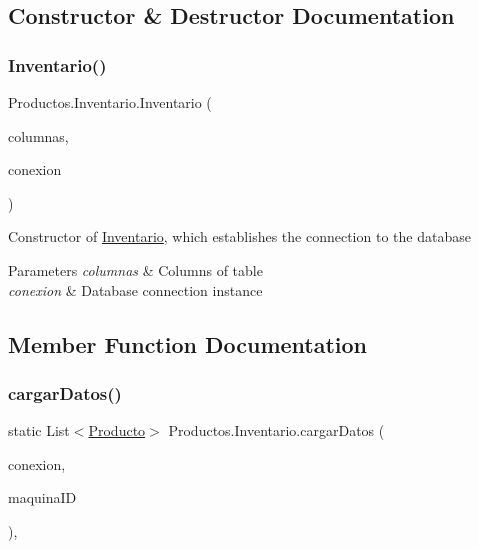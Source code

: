 \subsection{Constructor \& Destructor Documentation}
\mbox{\label{class_productos_1_1_inventario_a679f0131ec8bfb9a78d5071ee72f6811}} 
\subsubsection{\texorpdfstring{Inventario()}{Inventario()}}
{\footnotesize\ttfamily Productos.\+Inventario.\+Inventario (\begin{DoxyParamCaption}\item[{\mbox{\hyperlink{class_productos_1_1_modelo_columnas_tabla_producto}{Modelo\+Columnas\+Tabla\+Producto}}}]{columnas,  }\item[{\mbox{\hyperlink{classconexion_s_q_l_1_1_my_data_access}{My\+Data\+Access}}}]{conexion }\end{DoxyParamCaption})\hspace{0.3cm}{\ttfamily [inline]}}

Constructor of \mbox{\hyperlink{class_productos_1_1_inventario}{Inventario}}, which establishes the connection to the database 
\begin{DoxyParams}{Parameters}
{\em columnas} & Columns of table \\
\hline
{\em conexion} & Database connection instance \\
\hline
\end{DoxyParams}


\subsection{Member Function Documentation}
\mbox{\label{class_productos_1_1_inventario_a89ddb54b03480d0e837f56be549b755c}} 
\subsubsection{\texorpdfstring{cargar\+Datos()}{cargarDatos()}}
{\footnotesize\ttfamily static List$<$\mbox{\hyperlink{class_productos_1_1_producto}{Producto}}$>$ Productos.\+Inventario.\+cargar\+Datos (\begin{DoxyParamCaption}\item[{\mbox{\hyperlink{classconexion_s_q_l_1_1_my_data_access}{My\+Data\+Access}}}]{conexion,  }\item[{int}]{maquina\+ID }\end{DoxyParamCaption})\hspace{0.3cm}{\ttfamily [inline]}, {\ttfamily [static]}}

